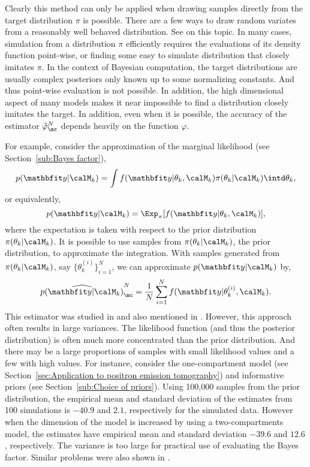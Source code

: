Clearly this method can only be applied when drawing samples directly from
the target distribution $\pi$ is possible. There are a few ways to draw
random variates from a reasonably well behaved distribution. See
\cite[][chap.~2]{Robert:2004tn} on this topic. In many cases, simulation from
a distribution $\pi$ efficiently requires the evaluations of its density
function point-wise, or finding some easy to simulate distribution that
closely imitates $\pi$. In the context of Bayesian computation, the target
distributions are usually complex posteriors only known up to some
normalizing constants. And thus point-wise evaluation is not possible. In
addition, the high dimensional aspect of many models makes it near impossible
to find a distribution closely imitates the target. In addition, even when it
is possible, the accuracy of the estimator $\hat\varphi_{\mc}^N$ depends
heavily on the function $\varphi$.

For example, consider the approximation of the marginal likelihood (see
Section~\ref{sub:Bayes factor}),
\begin{equation*}
  p(\data|\calM_k) =
  \int f(\data|\theta_k,\calM_k)\pi(\theta_k|\calM_k) \intd \theta_k,
\end{equation*}
or equivalently,
\begin{equation}
  p(\data|\calM_k) = \Exp_{\pi}[f(\data|\theta_k,\calM_k)],
  \label{eq:prior expectation}
\end{equation}
where the expectation is taken with respect to the prior distribution
$\pi(\theta_k|\calM_k)$. It is possible to use samples from
$\pi(\theta_k|\calM_k)$, the prior distribution, to approximate the
integration. With samples generated from $\pi(\theta_k|\calM_k)$, say
$\{\theta_k^{(i)}\}_{i=1}^N$, we can approximate $p(\data|\calM_k)$ by,
\begin{equation}
  \widehat{p(\data|\calM_k)}_{\mc}^N
  = \frac{1}{N}\sum_{i=1}^N f(\data|\theta_k^{(i)},\calM_k).
\end{equation}
This estimator was studied in \cite{McCulloch:1991hj} and also mentioned in
\cite{Kass:1995vb}. However, this approach often results in large variances.
The likelihood function (and thus the posterior distribution) is often much
more concentrated than the prior distribution. And there may be a large
proportions of samples with small likelihood values and a few with high
values. For instance, consider the one-compartment \pet model (see
Section~\ref{sec:Application to positron emission tomography}) and
informative priors (see Section~\ref{sub:Choice of priors}). Using 100,000
samples from the prior distribution, the empirical mean and standard
deviation of the estimates from 100 simulations is $-40.9$ and $2.1$,
respectively for the simulated data. However when the dimension of the model
is increased by using a two-compartments model, the estimates have empirical
mean and standard deviation $-39.6$ and $12.6$, respectively. The variance is
too large for practical use of evaluating the Bayes factor. Similar problems
were also shown in \cite{McCulloch:1991hj}.

